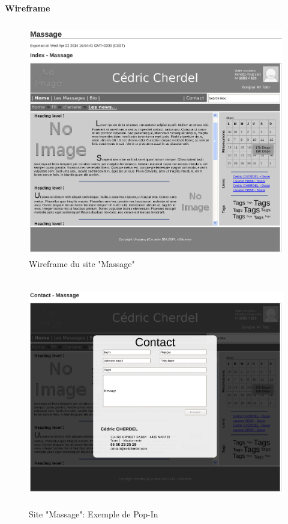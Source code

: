 \documentclass[11pt,a4paper]{report}
\begin{document}
			\paragraph*{Wireframe}\subparagraph*{}
				\begin{figure}[H]
					\centering
					\includegraphics[height=10cm]{Wireframe-Massage_1.eps}
					\caption{Wireframe du site "Massage"}
					\label{fig:Wireframe-Massage_1}
				\end{figure}
				\begin{figure}[H]
					\centering
					\includegraphics[height=10cm]{Wireframe-Massage_2.eps}
					\caption{Site "Massage": Exemple de Pop-In}
					\label{fig:Wireframe-Massage_2}
				\end{figure}
\end{document}
